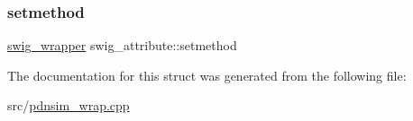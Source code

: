 \mbox{\label{structswig__attribute_a472e7eb40e7248b6d4b5cb0118aa1331}} 
\subsubsection{\texorpdfstring{setmethod}{setmethod}}
{\footnotesize\ttfamily \hyperlink{pdnsim__wrap_8cpp_a26e4d1918011eb5b4aa36f67e1d5a318}{swig\+\_\+wrapper} swig\+\_\+attribute\+::setmethod}



The documentation for this struct was generated from the following file\+:\begin{DoxyCompactItemize}
\item 
src/\hyperlink{pdnsim__wrap_8cpp}{pdnsim\+\_\+wrap.\+cpp}\end{DoxyCompactItemize}

